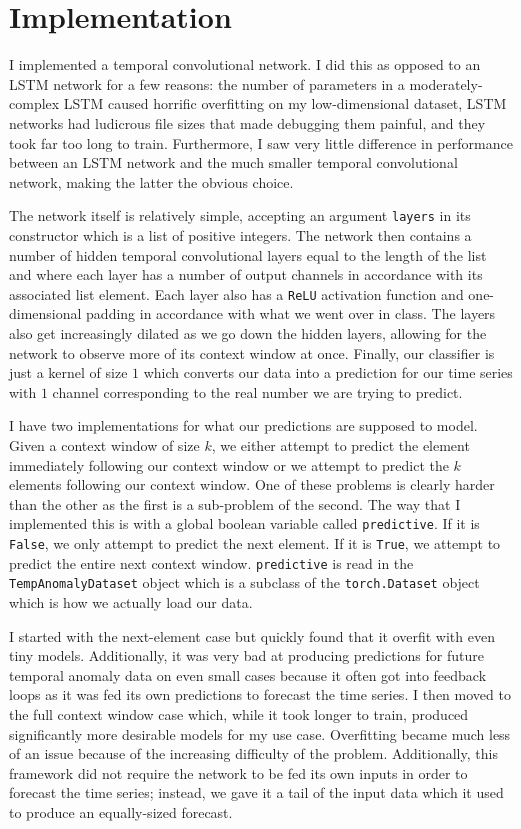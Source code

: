 \documentclass[letterpaper,12pt]{article}
\theoremstyle{plain}
\theoremstyle{definition}
\newcounter{r}
\newcommand\tx[1]{\texttt{#1}}
\begin{document}
\section{Implementation}

I implemented a temporal convolutional network. I did this as opposed to an
LSTM network for a few reasons: the number of parameters in a
moderately-complex LSTM caused horrific overfitting on my low-dimensional
dataset, LSTM networks had ludicrous file sizes that made debugging them
painful, and they took far too long to train. Furthermore, I saw very little
difference in performance between an LSTM network and the much smaller temporal
convolutional network, making the latter the obvious choice.

The network itself is relatively simple, accepting an argument \tx{layers} in
its constructor which is a list of positive integers. The network then contains
a number of hidden temporal convolutional layers equal to the length of the
list and where each layer has a number of output channels in accordance with
its associated list element. Each layer also has a \tx{ReLU} activation
function and one-dimensional padding in accordance with what we went over in
class. The layers also get increasingly dilated as we go down the hidden
layers, allowing for the network to observe more of its context window at once.
Finally, our classifier is just a kernel of size $1$ which converts our data
into a prediction for our time series with $1$ channel corresponding to the
real number we are trying to predict.

I have two implementations for what our predictions are supposed to model.
Given a context window of size $k$, we either attempt to predict the element
immediately following our context window or we attempt to predict the $k$
elements following our context window. One of these problems is clearly harder
than the other as the first is a sub-problem of the second. The way that I
implemented this is with a global boolean variable called \tx{predictive}. If
it is \tx{False}, we only attempt to predict the next element. If it is
\tx{True}, we attempt to predict the entire next context window.
\tx{predictive} is read in the \tx{TempAnomalyDataset} object which is a
subclass of the \tx{torch.Dataset} object which is how we actually load our
data.

I started with the next-element case but quickly found that it overfit with
even tiny models. Additionally, it was very bad at producing predictions for
future temporal anomaly data on even small cases because it often got into
feedback loops as it was fed its own predictions to forecast the time series. I
then moved to the full context window case which, while it took longer to
train, produced significantly more desirable models for my use case.
Overfitting became much less of an issue because of the increasing difficulty
of the problem. Additionally, this framework did not require the network to be
fed its own inputs in order to forecast the time series; instead, we gave it a
tail of the input data which it used to produce an equally-sized forecast.
\end{document}
